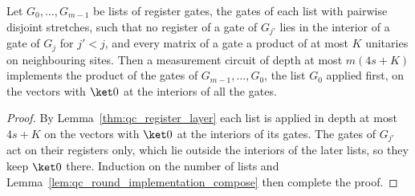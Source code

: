 \begin{lemma}
    \label{thm:ldp_register_layers}
    \leanok
    Let $G_0,\dots,G_{m-1}$ be lists of register gates, the gates of each list
    with pairwise disjoint stretches, such that no register of a gate of $G_{j'}$
    lies in the interior of a gate of $G_j$ for $j'<j$, and every matrix of a
    gate a product of at most $K$ unitaries on neighbouring sites. Then
    a measurement circuit of depth at most $m(4s+K)$ implements the product of the
    gates of $G_{m-1},\dots,G_0$, the list $G_0$ applied first, on the vectors
    with $\ket0$ at the interiors of all the gates.
\end{lemma}
\begin{proof}
    \leanok
    By Lemma~\ref{thm:qc_register_layer} each list is applied in depth at most
    $4s+K$ on the vectors with $\ket0$ at the interiors of its gates. The
    gates of $G_{j'}$ act on their registers only, which lie outside the
    interiors of the later lists, so they keep $\ket0$ there. Induction on the
    number of lists and Lemma~\ref{lem:qc_round_implementation_compose} then
    complete the proof.
\end{proof}

